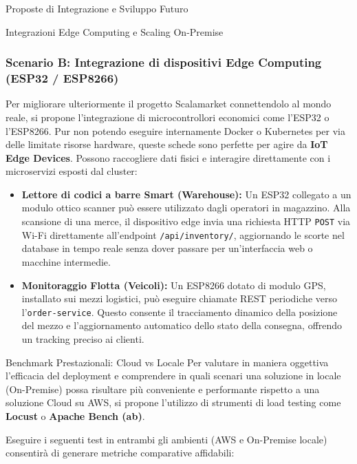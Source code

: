 \begin{mychapter}{Proposte di Integrazione e Sviluppo Futuro}
\begin{mysection}{Integrazioni Edge Computing e Scaling On-Premise}
\subsubsection*{Scenario B: Integrazione di dispositivi Edge Computing (ESP32 / ESP8266)}
Per migliorare ulteriormente il progetto Scalamarket connettendolo al mondo reale, si propone l'integrazione di microcontrollori economici come l'ESP32 o l'ESP8266. Pur non potendo eseguire internamente Docker o Kubernetes per via delle limitate risorse hardware, queste schede sono perfette per agire da \textbf{IoT Edge Devices}.
Possono raccogliere dati fisici e interagire direttamente con i microservizi esposti dal cluster:
\begin{itemize}
    \item \textbf{Lettore di codici a barre Smart (Warehouse):} Un ESP32 collegato a un modulo ottico scanner può essere utilizzato dagli operatori in magazzino. Alla scansione di una merce, il dispositivo edge invia una richiesta HTTP \texttt{POST} via Wi-Fi direttamente all'endpoint \texttt{/api/inventory/}, aggiornando le scorte nel database in tempo reale senza dover passare per un'interfaccia web o macchine intermedie.
    \item \textbf{Monitoraggio Flotta (Veicoli):} Un ESP8266 dotato di modulo GPS, installato sui mezzi logistici, può eseguire chiamate REST periodiche verso l'\texttt{order-service}. Questo consente il tracciamento dinamico della posizione del mezzo e l'aggiornamento automatico dello stato della consegna, offrendo un tracking preciso ai clienti.
\end{itemize}
\end{mysection}

\begin{mysection}{Benchmark Prestazionali: Cloud vs Locale}
Per valutare in maniera oggettiva l'efficacia del deployment e comprendere in quali scenari una soluzione in locale (On-Premise) possa risultare più conveniente e performante rispetto a una soluzione Cloud su AWS, si propone l'utilizzo di strumenti di load testing come \textbf{Locust} o \textbf{Apache Bench (ab)}.

Eseguire i seguenti test in entrambi gli ambienti (AWS e On-Premise locale) consentirà di generare metriche comparative affidabili:


\end{mysection}
\end{mychapter}
